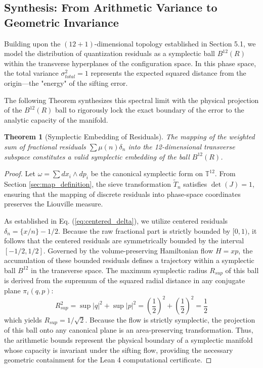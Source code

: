 \documentclass[sn-mathphys-num, pdflatex, referee]{sn-jnl}
\newtheorem{theorem}{Theorem}[section]
\begin{document}
\subsection{Synthesis: From Arithmetic Variance to Geometric Invariance}
\label{sec:synthesis}

Building upon the $(12+1)$-dimensional topology established in Section 5.1, we model the distribution of quantization residuals as a symplectic ball $B^{12}(R)$ within the transverse hyperplanes of the configuration space. In this phase space, the total variance $\sigma_{total}^2 = 1$ represents the expected squared distance from the origin—the "energy" of the sifting error. 

The following Theorem synthesizes this spectral limit with the physical projection of the $B^{12}(R)$ ball to rigorously lock the exact boundary of the error to the analytic capacity of the manifold.

\begin{theorem}[Symplectic Embedding of Residuals]
\label{SER}
\textit{The mapping of the weighted sum of fractional residuals $\sum \mu(n) \delta_n$ into the 12-dimensional transverse subspace constitutes a valid symplectic embedding of the ball $B^{12}(R)$.}
\end{theorem}

\begin{proof}
Let $\omega = \sum dx_i \wedge dp_i$ be the canonical symplectic form on $\mathbb{T}^{12}$. From Section \ref{sec:map_definition}, the sieve transformation $\tilde{T}_n$ satisfies $\det(J) = 1$, ensuring that the mapping of discrete residuals into phase-space coordinates preserves the Liouville measure. 

As established in Eq. (\ref{eq:centered_delta}), we utilize centered residuals $\delta_n = \{x/n\} - 1/2$. Because the raw fractional part is strictly bounded by $[0, 1)$, it follows that the centered residuals are symmetrically bounded by the interval $[-1/2, 1/2]$. Governed by the volume-preserving Hamiltonian flow $H=xp$, the accumulation of these bounded residuals defines a trajectory within a symplectic ball $B^{12}$ in the transverse space. The maximum symplectic radius $R_{sup}$ of this ball is derived from the supremum of the squared radial distance in any conjugate plane $\pi_i(q, p)$:
\begin{equation}
R_{sup}^2 = \sup|q|^2 + \sup|p|^2 = \left( \frac{1}{2} \right)^2 + \left( \frac{1}{2} \right)^2 = \frac{1}{2}
\end{equation}
which yields $R_{sup} = 1/\sqrt{2}$. Because the flow is strictly symplectic, the projection of this ball onto any canonical plane is an area-preserving transformation. Thus, the arithmetic bounds represent the physical boundary of a symplectic manifold whose capacity is invariant under the sifting flow, providing the necessary geometric containment for the Lean 4 computational certificate.
\end{proof}
\end{document}
